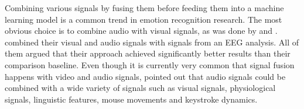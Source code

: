 \newline\newline
Combining various signals by fusing them before feeding them into a machine learning model is a common trend in emotion recognition research. The most obvious choice is to combine audio with visual signals, as was done by \citet{Yan:2016:MultiClueFusion} and \citet{Hossain:2019:AudioVisualER}. \citet{Xing:2019:EEGAudioVisual} combined their visual and audio signals with signals from an EEG analysis. All of them argued that their approach achieved significantly better results than their comparison baseline.
\newline\newline %
Even though it is currently very common that signal fusion happens with video and audio signals, \citet{Akcay:2020:SpeechEmotionRecognition(SER)} pointed out that audio signals could be combined with a wide variety of signals such as visual signals, physiological signals, linguistic features, mouse movements and keystroke dynamics.



